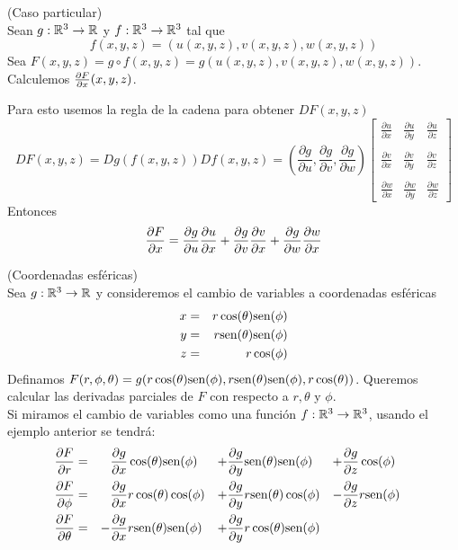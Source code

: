 \begin{ejemplo}{\rm (Caso particular)} 
\\Sean $g:\mathbb{R}^3\to\mathbb{R}$ y $f:\mathbb{R}^3\to\mathbb{R}^3$ 
tal que
$$f(x,y,z)=(u(x,y,z),v(x,y,z),w(x,y,z))$$
Sea $F(x,y,z)=g\circ f(x,y,z)=g(u(x,y,z),v(x,y,z),w(x,y,z))$.
Calculemos $\frac{\partial F}{\partial x}(x,y,z)$. 

\begin{solucion}
Para esto usemos la regla de la cadena
para obtener $DF(x,y,z)$
$$
DF(x,y,z)=Dg(f(x,y,z))Df(x,y,z)=\left(\frac{\partial g}
{\partial u},\frac{\partial g}{\partial v},\frac{\partial g}{\partial w}\right)
\left[
\begin{array}{ccc}
\frac{\partial u}{\partial x}&\frac{\partial u}
{\partial y}&\frac{\partial u}{\partial z}\\ 
 & & \\
\frac{\partial v}{\partial x}&
\frac{\partial v}{\partial y}&\frac{\partial v}{\partial z}\\ 
 & & \\
\frac{\partial w}{\partial x}&\frac{\partial w}{\partial y}&
\frac{\partial w}{\partial z}
\end{array}
\right]
$$
Entonces
$$
\frac{\partial F}{\partial x}=\frac{\partial g}{\partial u}\frac{\partial u}{\partial x}+
\frac{\partial g}{\partial v}\frac{\partial v}{\partial x}+
\frac{\partial g}{\partial w}\frac{\partial w}{\partial x} $$
\end{solucion}
\end{ejemplo}

\begin{ejemplo}{\rm (Coordenadas esf\'ericas)} 
\\Sea $g:\mathbb{R}^3\to\mathbb{R}$ y consideremos
el cambio de variables a coordenadas esf\'ericas
\begin{eqnarray*}
x&=&r\cos(\theta)\text{sen}(\phi)\cr 
y&=&r\text{sen}(\theta)\text{sen}(\phi)
\cr z&=&r\cos(\phi)
\end{eqnarray*}
Definamos $F(r,\phi,\theta)=g(r\cos(\theta) \text{sen}(\phi),r\text{sen}(\theta) \text{sen}(\phi),r\cos(\theta))$. Queremos calcular las derivadas parciales de $F$ con respecto a $r, \theta$ y 
$\phi$.
\\Si miramos el cambio de variables como una funci\'on $f:\mathbb{R}^3\to\mathbb{R}^3$, usando 
el ejemplo anterior se tendr\'a:
\begin{alignat*}{7}
\frac{\partial F}{\partial r}&= 
& &\frac{\partial g}{\partial x}\cos(\theta)\text{sen}(\phi)&+&
\frac{\partial g}{\partial y}\text{sen}(\theta)\text{sen}(\phi)&+&
\frac{\partial g}{\partial z}\cos(\phi) \cr
\frac{\partial F}{\partial \phi}&=
& &\frac{\partial g}{\partial x}r\cos(\theta)\cos(\phi)&+&
\frac{\partial g}{\partial y}r\text{sen}(\theta)\cos(\phi)&-&
\frac{\partial g}{\partial z}r\text{sen}(\phi) \cr
\frac{\partial F}{\partial \theta}&=
&-&\frac{\partial g}{\partial x}r\text{sen}(\theta)\text{sen}(\phi)&+&
\frac{\partial g}{\partial y}r\cos(\theta)\text{sen}(\phi)& &
\end{alignat*}
\end{ejemplo}


